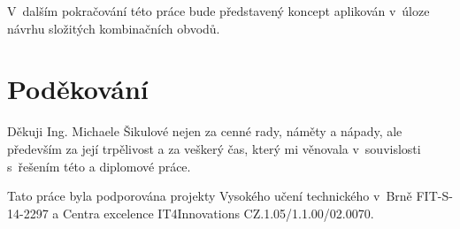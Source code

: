 \documentclass[czech]{ExcelAtFIT} %
\begin{document}
V~dalším pokračování této práce bude představený koncept apli\-ko\-ván v~úloze návrhu složitých kombinačních obvodů.


\section*{Poděkování}
\label{sec:Acknowledgements}

Děkuji Ing. Michaele Šikulové nejen za cenné rady, náměty a nápady, ale především za její trpělivost a za veškerý čas, který mi věnovala v~souvislosti s~řešením této a diplomové práce.

Tato práce byla podporována projekty Vysokého učení technického v~Brně FIT-S-14-2297 a Centra excelence IT4Innovations CZ.1.05/1.1.00/02.0070.




\end{document}
